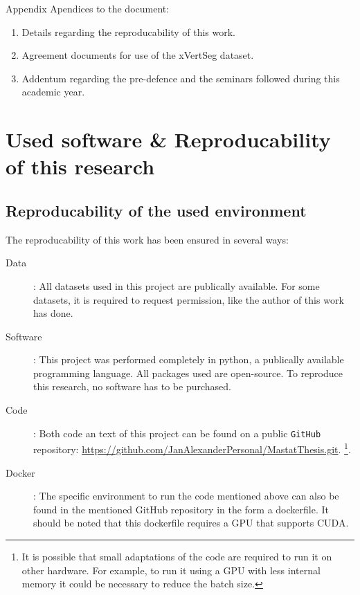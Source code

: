 \appendix

\begin{partwithabstract}{Appendix}
  Apendices to the document:
  \begin{enumerate}
    \item Details regarding the reproducability of this work.
    \item Agreement documents for use of the xVertSeg dataset.
    \item Addentum regarding the pre-defence and the seminars followed during this academic year.
  \end{enumerate}
\end{partwithabstract}
\restoregeometry


\chapter{Used software \& Reproducability of this research}

\section{Reproducability of the used environment}
The reproducability of this work has been ensured in several ways:
\begin{description}
  \item[Data]: All datasets used in this project are publically available. For some datasets, it is required to request permission, like the author of this work has done.
  \item[Software]: This project was performed completely in python, a publically available programming language. 
  All packages used are open-source.
  To reproduce this research, no software has to be purchased. 
  \item[Code]: Both code an text of this project can be found on a public \texttt{GitHub} repository: \url{https://github.com/JanAlexanderPersonal/MastatThesis.git}.
  \footnote{It is possible that small adaptations of the code are required to run it on other hardware. For example, to run it using a GPU with less internal memory it could be necessary to reduce the batch size.}. 
  \item[Docker]: The specific environment to run the code mentioned above can also be found in the mentioned GitHub repository in the form a dockerfile.
  It should be noted that this dockerfile requires a GPU that supports CUDA.   
\end{description}


